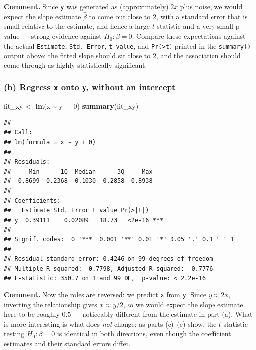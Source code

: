 \documentclass[
  11pt,
]{article}
\newenvironment{Shaded}{\begin{snugshade}}{\end{snugshade}}
\newcommand{\DecValTok}[1]{\textcolor[rgb]{0.00,0.00,0.81}{#1}}
\newcommand{\FunctionTok}[1]{\textcolor[rgb]{0.13,0.29,0.53}{\textbf{#1}}}
\newcommand{\NormalTok}[1]{#1}
\newcommand{\OtherTok}[1]{\textcolor[rgb]{0.56,0.35,0.01}{#1}}
\newcommand{\SpecialCharTok}[1]{\textcolor[rgb]{0.81,0.36,0.00}{\textbf{#1}}}
\begin{document}
\textbf{Comment.} Since \texttt{y} was generated as (approximately)
\(2x\) plus noise, we would expect the slope estimate \(\hat\beta\) to
come out close to \(2\), with a standard error that is small relative to
the estimate, and hence a large \(t\)-statistic and a very small p-value
--- strong evidence against \(H_0 : \beta = 0\). Compare these
expectations against the actual \texttt{Estimate}, \texttt{Std.\ Error},
\texttt{t\ value}, and \texttt{Pr(\textgreater{}\textbar{}t\textbar{})}
printed in the \texttt{summary()} output above: the fitted slope should
sit close to \(2\), and the association should come through as highly
statistically significant.

\subsubsection{\texorpdfstring{(b) Regress \texttt{x} onto \texttt{y},
without an
intercept}{(b) Regress x onto y, without an intercept}}\label{b-regress-x-onto-y-without-an-intercept}

\begin{Shaded}
\begin{Highlighting}[]
\NormalTok{fit\_xy }\OtherTok{\textless{}{-}} \FunctionTok{lm}\NormalTok{(x }\SpecialCharTok{\textasciitilde{}}\NormalTok{ y }\SpecialCharTok{+} \DecValTok{0}\NormalTok{)}
\FunctionTok{summary}\NormalTok{(fit\_xy)}
\end{Highlighting}
\end{Shaded}

\begin{verbatim}
## 
## Call:
## lm(formula = x ~ y + 0)
## 
## Residuals:
##     Min      1Q  Median      3Q     Max 
## -0.8699 -0.2368  0.1030  0.2858  0.8938 
## 
## Coefficients:
##   Estimate Std. Error t value Pr(>|t|)    
## y  0.39111    0.02089   18.73   <2e-16 ***
## ---
## Signif. codes:  0 '***' 0.001 '**' 0.01 '*' 0.05 '.' 0.1 ' ' 1
## 
## Residual standard error: 0.4246 on 99 degrees of freedom
## Multiple R-squared:  0.7798, Adjusted R-squared:  0.7776 
## F-statistic: 350.7 on 1 and 99 DF,  p-value: < 2.2e-16
\end{verbatim}

\textbf{Comment.} Now the roles are reversed: we predict \texttt{x} from
\texttt{y}. Since \(y \approx 2x\), inverting the relationship gives
\(x \approx y/2\), so we would expect the slope estimate here to be
roughly \(0.5\) --- noticeably different from the estimate in part (a).
What is more interesting is what does \emph{not} change: as parts
(c)--(e) show, the \(t\)-statistic testing \(H_0 : \beta = 0\) is
identical in both directions, even though the coefficient estimates and
their standard errors differ.
\end{document}
